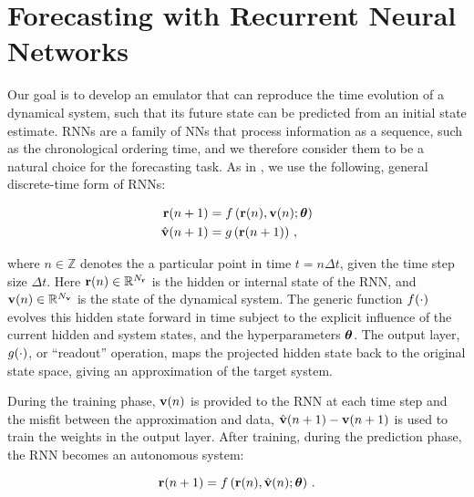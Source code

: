 \section{Forecasting with Recurrent Neural Networks}
\label{sec:rnn-architecture}

Our goal is to develop an emulator that can reproduce the time evolution of a
dynamical system, such that its future state can be predicted from an initial
state estimate.
RNNs are a family of NNs that process information as a sequence,
such as the chronological ordering time,
and we therefore consider them to be a natural choice for the forecasting
task.
As in \citet{goodfellow_sequence_2016}, we use the following, general discrete-time
form of RNNs:
\begin{linenomath*}\begin{equation}
    \begin{aligned}
        \mathbf{r}(n+1) &= f\left(
            \mathbf{r}(n), \mathbf{v}(n); \bm{\theta}
            \right) \\
        \hat{\mathbf{v}}(n+1) &= g \left( \mathbf{r}(n+1) \right) \, ,
    \end{aligned}
    \label{eq:rnn}
\end{equation}\end{linenomath*}
where $n\in\mathbb{Z}$ denotes the a particular point in time $t = n\Delta t$,
given the time step size $\Delta t$.
Here
$\mathbf{r}(n)\in\mathbb{R}^{N_{\mathbf{r}}}$ is the hidden or internal state of the RNN,
and
$\mathbf{v}(n)\in\mathbb{R}^{N_{\mathbf{v}}}$ is the state of the dynamical system.
The generic function $f(\cdot)$ evolves this hidden state forward in
time subject to the explicit
influence of the current hidden and system states, and the hyperparameters
$\bm{\theta}$.
The output layer,
$g(\cdot)$, or ``readout'' operation,
maps the projected hidden state back to the original state space, giving an
approximation of the target system.

During the training phase, $\mathbf{v}(n)$ is provided to the RNN at each time step
and the misfit between the approximation and data,
$\hat{\mathbf{v}}(n+1) - \mathbf{v}(n+1)$ is used to train the weights in the output
layer.
After training, during the prediction phase, the RNN becomes an autonomous
system:
\begin{linenomath*}\begin{equation*}
    \mathbf{r}(n+1) = f\left(
        \mathbf{r}(n), \hat{\mathbf{v}}(n); \bm{\theta}\right) \, .
\end{equation*}\end{linenomath*}

